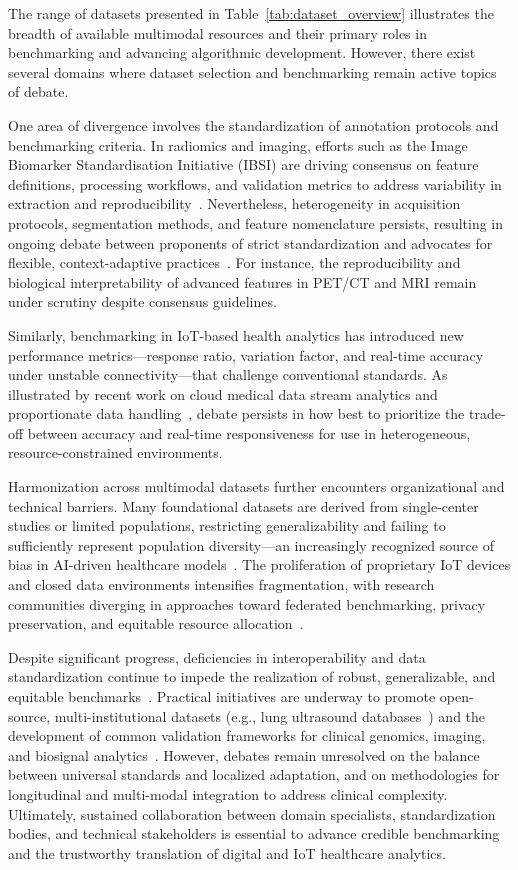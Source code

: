 \documentclass[sigconf]{acmart}
\begin{document}
The range of datasets presented in Table~\ref{tab:dataset_overview} illustrates the breadth of available multimodal resources and their primary roles in benchmarking and advancing algorithmic development. However, there exist several domains where dataset selection and benchmarking remain active topics of debate.

One area of divergence involves the standardization of annotation protocols and benchmarking criteria. In radiomics and imaging, efforts such as the Image Biomarker Standardisation Initiative (IBSI) are driving consensus on feature definitions, processing workflows, and validation metrics to address variability in extraction and reproducibility~\cite{ref44,ref45,ref46}. Nevertheless, heterogeneity in acquisition protocols, segmentation methods, and feature nomenclature persists, resulting in ongoing debate between proponents of strict standardization and advocates for flexible, context-adaptive practices~\cite{ref45}. For instance, the reproducibility and biological interpretability of advanced features in PET/CT and MRI remain under scrutiny despite consensus guidelines.

Similarly, benchmarking in IoT-based health analytics has introduced new performance metrics---response ratio, variation factor, and real-time accuracy under unstable connectivity---that challenge conventional standards. As illustrated by recent work on cloud medical data stream analytics and proportionate data handling~\cite{ref106}, debate persists in how best to prioritize the trade-off between accuracy and real-time responsiveness for use in heterogeneous, resource-constrained environments.

Harmonization across multimodal datasets further encounters organizational and technical barriers. Many foundational datasets are derived from single-center studies or limited populations, restricting generalizability and failing to sufficiently represent population diversity---an increasingly recognized source of bias in AI-driven healthcare models~\cite{ref43,ref75,ref106}. The proliferation of proprietary IoT devices and closed data environments intensifies fragmentation, with research communities diverging in approaches toward federated benchmarking, privacy preservation, and equitable resource allocation~\cite{ref51,ref84,ref106}.

Despite significant progress, deficiencies in interoperability and data standardization continue to impede the realization of robust, generalizable, and equitable benchmarks~\cite{ref82,ref83,ref84}. Practical initiatives are underway to promote open-source, multi-institutional datasets (e.g., lung ultrasound databases~\cite{ref58}) and the development of common validation frameworks for clinical genomics, imaging, and biosignal analytics~\cite{ref60,ref61}. However, debates remain unresolved on the balance between universal standards and localized adaptation, and on methodologies for longitudinal and multi-modal integration to address clinical complexity. Ultimately, sustained collaboration between domain specialists, standardization bodies, and technical stakeholders is essential to advance credible benchmarking and the trustworthy translation of digital and IoT healthcare analytics.
\end{document}
